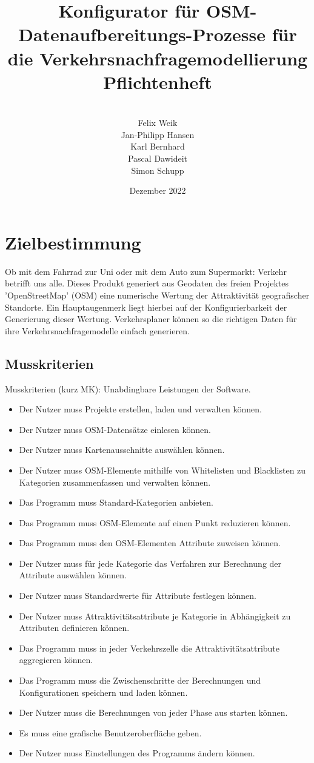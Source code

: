 \documentclass[parskip=full]{scrartcl} %
\title{Konfigurator für OSM-Datenaufbereitungs-Prozesse für die Verkehrsnachfragemodellierung \\ \vspace{2mm}\large{}Pflichtenheft}
\author{
\vspace{5mm}\\
Felix Weik\\ Jan-Philipp Hansen\\ Karl Bernhard\\ Pascal Dawideit\\ Simon Schupp}
\date{Dezember 2022}
\begin{document}
\maketitle
\newpage

\tableofcontents
\newpage


\section{Zielbestimmung}
Ob mit dem Fahrrad zur Uni oder mit dem Auto zum Supermarkt: Verkehr betrifft uns alle. Dieses Produkt generiert aus Geodaten des freien Projektes 'OpenStreetMap' (OSM) eine numerische Wertung der Attraktivität geografischer Standorte. Ein Hauptaugenmerk liegt hierbei auf der Konfigurierbarkeit der Generierung dieser Wertung. Verkehrsplaner können so die richtigen Daten für ihre Verkehrsnachfragemodelle einfach generieren.

\subsection{Musskriterien}
Musskriterien (kurz MK): Unabdingbare Leistungen der Software.

\begin{itemize}
    \item <MK1> Der Nutzer muss Projekte erstellen, laden und verwalten können.
    \item <MK2> Der Nutzer muss OSM-Datensätze einlesen können.
    \item <MK3> Der Nutzer muss Kartenausschnitte auswählen können.
    \item <MK4> Der Nutzer muss OSM-Elemente mithilfe von Whitelisten und Blacklisten zu Kategorien zusammenfassen und verwalten können.
    \item <MK5> Das Programm muss Standard-Kategorien anbieten.
    \item <MK6> Das Programm muss OSM-Elemente auf einen Punkt reduzieren können.
    \item <MK7> Das Programm muss den OSM-Elementen Attribute zuweisen können.
    \item <MK8> Der Nutzer muss für jede Kategorie das Verfahren zur Berechnung der Attribute auswählen können.
    \item <MK9> Der Nutzer muss Standardwerte für Attribute festlegen können.
    \item <MK10> Der Nutzer muss Attraktivitätsattribute je Kategorie in Abhängigkeit zu Attributen definieren können.
    \item <MK11> Das Programm muss in jeder Verkehrszelle die Attraktivitätsattribute aggregieren können.
    \item <MK12> Das Programm muss die Zwischenschritte der Berechnungen und Konfigurationen speichern und laden können.
    \item <MK13> Der Nutzer muss die Berechnungen von jeder Phase aus starten können.
    \item <MK14> Es muss eine grafische Benutzeroberfläche geben.
    \item <MK15> Der Nutzer muss Einstellungen des Programms ändern können.
\end{itemize}
\end{document}
